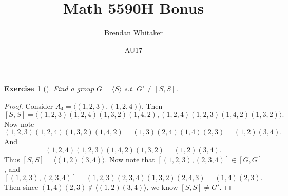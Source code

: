 \documentclass[10pt,oneside,reqno]{amsart}
\theoremstyle{plain}
\newtheorem*{e}{Exercise}
\theoremstyle{definition}
\begin{document}
\title{Math 5590H Bonus}

\date{AU17}

\author[Brendan Whitaker]{Brendan Whitaker}

\maketitle

\begin{e}[]
Find a group $G = \langle S\rangle$ s.t. $G' \neq [S,S]$. 
\end{e}

\begin{proof}
Consider $A_4 = \langle (1,2,3),(1,2,4)\rangle$. Then
\[[S,S] = \langle (1,2,3)(1,2,4)(1,3,2)(1,4,2),(1,2,4)(1,2,3)(1,4,2)(1,3,2)\rangle.  \]
Now note
\[(1,2,3)(1,2,4)(1,3,2)(1,4,2) =  (1,3)(2,4)(1,4)(2,3) = (1,2)(3,4).\]
And 
\[(1,2,4)(1,2,3)(1,4,2)(1,3,2) = (1,2)(3,4).\]
Thus $[S,S] = \langle (1,2)(3,4) \rangle$. Now note that $[(1,2,3),(2,3,4)] \in [G,G]$, and 
\[[(1,2,3),(2,3,4)] = (1,2,3)(2,3,4)(1,3,2)(2,4,3) = (1,4)(2,3). \]
Then since $(1,4)(2,3) \notin \langle (1,2)(3,4) \rangle$, we know $[S,S] \neq G'$. 
\end{proof}
\end{document}
